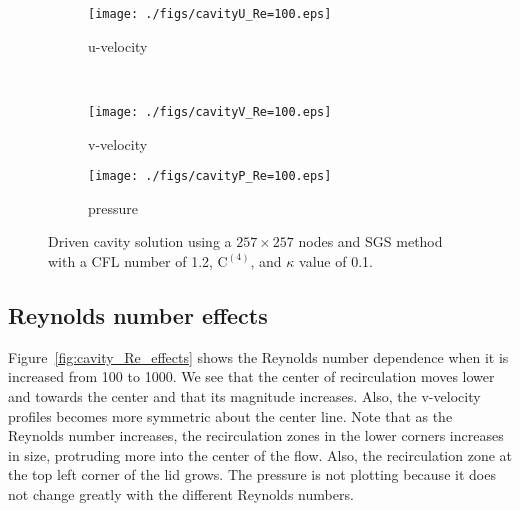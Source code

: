 \documentclass[10pt, letterpaper]{article}
\newcommand{\mesh}[1]{${#1} \times {#1}$}
\begin{document}
\begin{figure}[hb]
	\centering
	\begin{subfigure}[b]{0.475\textwidth}
		\centering
		\texttt{[image: ./figs/cavityU\_Re=100.eps]}
		\caption{u-velocity}
	\end{subfigure}
	~
	\begin{subfigure}[b]{0.475\textwidth}
		\centering
		\texttt{[image: ./figs/cavityV\_Re=100.eps]}
		\caption{v-velocity}
	\end{subfigure}
	
	\begin{subfigure}[b]{0.475\textwidth}
		\centering
		\texttt{[image: ./figs/cavityP\_Re=100.eps]}
		\caption{pressure}
	\end{subfigure}
	\caption{Driven cavity solution using a \mesh{257} nodes and SGS method with
		a CFL number of 1.2, $\mathrm{C^{(4)}}$, and $\kappa$ value of 0.1.}
	\label{fig:cavity_100}
\end{figure}

\clearpage


\subsection{Reynolds number effects}

Figure~\ref{fig:cavity_Re_effects} shows the Reynolds number dependence when it is 
increased from 100 to 1000.  We see that the center of recirculation
moves lower and towards the center and that its magnitude increases.  Also,
the v-velocity profiles becomes more symmetric about the center line.  Note that
as the Reynolds number increases, the recirculation zones in the lower corners
increases in size, protruding more into the center of the flow.  Also, the 
recirculation zone at the top left corner of the lid grows.  
The pressure is not plotting
because it does not change greatly with the different Reynolds numbers.
\end{document}
